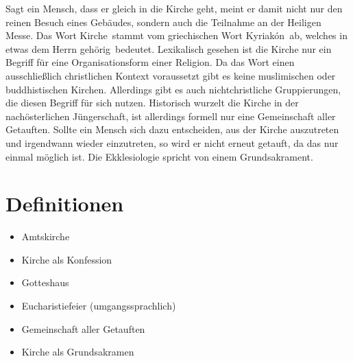 \documentclass[../Religion.tex]{subfiles}
\begin{document}
	Sagt ein Mensch, dass er gleich in die Kirche geht, meint er damit nicht nur den reinen Besuch eines Gebäudes, sondern auch die Teilnahme an der Heiligen Messe.
	Das Wort \dq Kirche\dq\ stammt vom griechischen Wort \dq Kyriakón\dq\ ab, welches in etwas \dq dem Herrn gehörig\dq\ bedeutet.
	Lexikalisch gesehen ist die Kirche nur ein Begriff für eine Organisationsform einer Religion.
	Da das Wort einen ausschließlich christlichen Kontext voraussetzt gibt es keine muslimischen oder buddhistischen Kirchen.
	Allerdings gibt es auch nichtchristliche Gruppierungen, die diesen Begriff für sich nutzen.
	Historisch wurzelt die Kirche in der nachösterlichen Jüngerschaft, ist allerdings formell nur eine Gemeinschaft aller Getauften.
	Sollte ein Mensch sich dazu entscheiden, aus der Kirche auszutreten und irgendwann wieder einzutreten, so wird er nicht erneut getauft, da das nur einmal möglich ist.
	Die Ekklesiologie spricht von einem Grundsakrament.
	\section{Definitionen}
	\begin{itemize}
		\item Amtskirche
		\item Kirche als Konfession
		\item Gotteshaus
		\item Eucharistiefeier (umgangssprachlich)
		\item Gemeinschaft aller Getauften
		\item Kirche als Grundsakramen
	\end{itemize}
\end{document}
